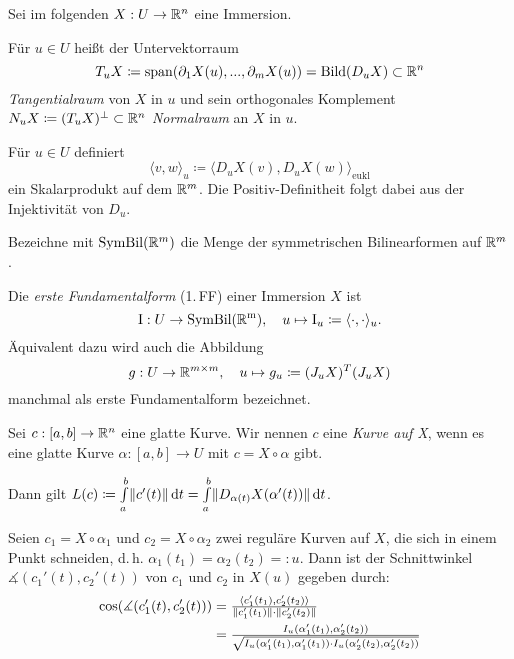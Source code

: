 \documentclass{cheat-sheet}
\newcommand{\Intabdt}[1]{\Int{a}{b}{#1}{t}}
\newcommand{\I}{\mathrm{I}}
\newcommand{\Span}{\mathrm{span}}
\begin{document}
\begin{nota}
  Sei im folgenden $X : U \to \mathbb{R}^n$ eine Immersion.
\end{nota}

\begin{defn}
  Für $u \in U$ heißt der Untervektorraum
  \[ T_u X \coloneqq \Span(\partial_1 X(u), ..., \partial_m X(u)) = \mathrm{Bild}(D_u X) \subset \R^n \]
  \emph{Tangentialraum} von $X$ in $u$ und sein orthogonales Komplement $N_u X \coloneqq (T_u X)^\perp \subset \mathbb{R}^n$ \emph{Normalraum} an $X$ in $u$.
\end{defn}

\begin{bem}
  Für $u \in U$ definiert
  \[ \langle v, w \rangle_u \coloneqq \langle D_u X(v), D_u X(w) \rangle_{\mathrm{eukl}} \]
  ein Skalarprodukt auf dem $\mathbb{R}^m$. Die Positiv-Definitheit folgt dabei aus der Injektivität von $D_u$.
\end{bem}

\begin{nota}
  Bezeichne mit $\mathrm{SymBil}(\mathbb{R}^m)$ die Menge der symmetrischen Bilinearformen auf $\mathbb{R}^m$.
\end{nota}

\begin{defn}
  Die \emph{erste Fundamentalform} (1.\,FF) einer Immersion $X$ ist
  \[ \I : U \to \mathrm{SymBil(\R^m)}, \quad u \mapsto \I_u \coloneqq \langle \cdot , \cdot \rangle_u. \]
  Äquivalent dazu wird auch die Abbildung
  \[ g : U \to \mathbb{R}^{m \times m}, \quad u \mapsto g_u \coloneqq (J_u X)^T (J_u X) \]
  manchmal als erste Fundamentalform bezeichnet.
\end{defn}

\begin{defn}
  Sei $c : [a, b] \to \mathbb{R}^n$ eine glatte Kurve. Wir nennen $c$ eine \emph{Kurve auf X}, wenn es eine glatte Kurve $\alpha : [a, b] \to U$ mit $c = X \circ \alpha$ gibt.
\end{defn}

\begin{bem}
  Dann gilt $L(c) \coloneqq \Intabdt{\norm{c'(t)}} = \Intabdt{\norm{D_{\alpha(t)} X(\alpha'(t))}}$.
\end{bem}

\begin{bem}
  Seien $c_1 = X \circ \alpha_1$ und $c_2 = X \circ \alpha_2$ zwei reguläre Kurven auf $X$, die sich in einem Punkt schneiden, d.\,h. $\alpha_1(t_1) = \alpha_2(t_2) =: u$. Dann ist der Schnittwinkel $\measuredangle(c_1'(t), c_2'(t))$ von $c_1$ und $c_2$ in $X(u)$ gegeben durch:
  \begin{align*}
    \cos(\measuredangle(c_1'(t), c_2'(t))) &= \tfrac{\langle c_1'(t_1) , c_2'(t_2) \rangle}{\lVert c_1'(t_1)\rVert \cdot \lVert c_2'(t_2)\rVert} \\
    &= \tfrac{I_u(\alpha_1'(t_1), \alpha_2'(t_2))}{\sqrt{I_u(\alpha_1'(t_1), \alpha_1'(t_1)) \cdot I_u(\alpha_2'(t_2), \alpha_2'(t_2))}}
  \end{align*}
\end{bem}
\end{document}
